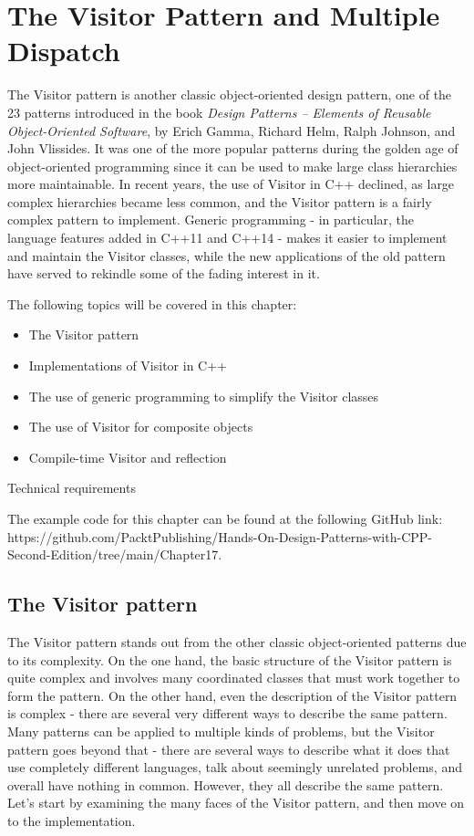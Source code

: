 ﻿\chapter{The Visitor Pattern and Multiple Dispatch}

The Visitor pattern is another classic object-oriented design pattern, one of the 23 patterns introduced in the book \emph{Design Patterns -- Elements of Reusable Object-Oriented Software}, by Erich Gamma, Richard Helm, Ralph Johnson, and John Vlissides. It was one of the more popular patterns during the golden age of object-oriented programming since it can be used to make large class hierarchies more maintainable. In recent years, the use of Visitor in C++ declined, as large complex hierarchies became less common, and the Visitor pattern is a fairly complex pattern to implement. Generic programming - in particular, the language features added in C++11 and C++14 - makes it easier to implement and maintain the Visitor classes, while the new applications of the old pattern have served to rekindle some of the fading interest in it.

The following topics will be covered in this chapter:

\begin{itemize}
\item
  The Visitor pattern
\item
  Implementations of Visitor in C++
\item
  The use of generic programming to simplify the Visitor classes
\item
  The use of Visitor for composite objects
\item
  Compile-time Visitor and reflection
\end{itemize}

Technical requirements

The example code for this chapter can be found at the following GitHub link: https://github.com/PacktPublishing/Hands-On-Design-Patterns-with-CPP-Second-Edition/tree/main/Chapter17.

\section{The Visitor pattern}

The Visitor pattern stands out from the other classic object-oriented patterns due to its complexity. On the one hand, the basic structure of the Visitor pattern is quite complex and involves many coordinated classes that must work together to form the pattern. On the other hand, even the description of the Visitor pattern is complex - there are several very different ways to describe the same pattern. Many patterns can be applied to multiple kinds of problems, but the Visitor pattern goes beyond that - there are several ways to describe what it does that use completely different languages, talk about seemingly unrelated problems, and overall have nothing in common. However, they all describe the same pattern. Let's start by examining the many faces of the Visitor pattern, and then move on to the implementation.

